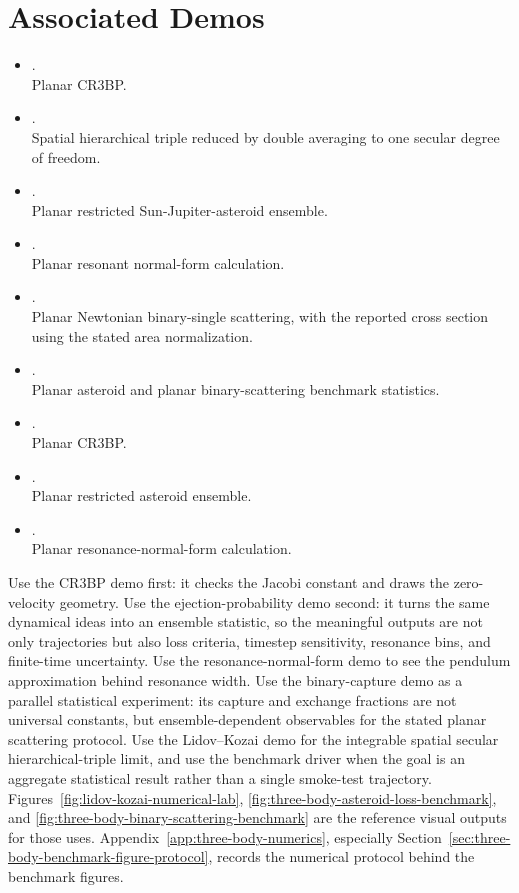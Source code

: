 \section{Associated Demos}
\label{sec:three-body-demos}

\begin{itemize}
\item {}.\\
Planar CR3BP.
\item {}.\\
Spatial hierarchical triple reduced by double averaging to one secular degree
of freedom.
\item {}.\\
Planar restricted Sun-Jupiter-asteroid ensemble.
\item {}.\\
Planar resonant normal-form calculation.
\item {}.\\
Planar Newtonian binary-single scattering, with the reported cross section
using the stated area normalization.
\item {}.\\
Planar asteroid and planar binary-scattering benchmark statistics.
\item {}.\\
Planar CR3BP.
\item {}.\\
Planar restricted asteroid ensemble.
\item {}.\\
Planar resonance-normal-form calculation.
\end{itemize}
Use the CR3BP demo first: it checks the Jacobi constant and draws the
zero-velocity geometry. Use the ejection-probability demo second: it turns the
same dynamical ideas into an ensemble statistic, so the meaningful outputs are
not only trajectories but also loss criteria, timestep sensitivity, resonance
bins, and finite-time uncertainty. Use the resonance-normal-form demo to see
the pendulum approximation behind resonance width. Use the binary-capture demo
as a parallel statistical experiment: its capture and exchange fractions are
not universal constants, but ensemble-dependent observables for the stated
planar scattering protocol. Use the Lidov--Kozai demo for the integrable
spatial secular hierarchical-triple limit, and use the benchmark driver when
the goal is an aggregate statistical result rather than a single smoke-test
trajectory. Figures~\ref{fig:lidov-kozai-numerical-lab},
\ref{fig:three-body-asteroid-loss-benchmark}, and
\ref{fig:three-body-binary-scattering-benchmark} are the reference visual
outputs for those uses.  Appendix~\ref{app:three-body-numerics}, especially
Section~\ref{sec:three-body-benchmark-figure-protocol}, records the numerical
protocol behind the benchmark figures.
